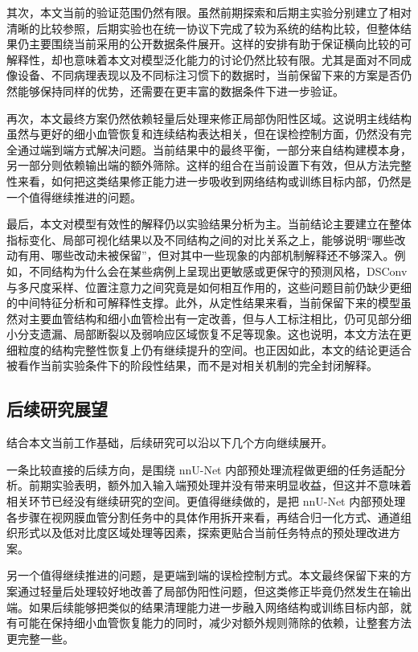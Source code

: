 \documentclass[a4paper,12pt]{article}
\begin{document}
其次，本文当前的验证范围仍然有限。虽然前期探索和后期主实验分别建立了相对清晰的比较参照，后期实验也在统一协议下完成了较为系统的结构比较，但整体结果仍主要围绕当前采用的公开数据条件展开。这样的安排有助于保证横向比较的可解释性，却也意味着本文对模型泛化能力的讨论仍然比较有限。尤其是面对不同成像设备、不同病理表现以及不同标注习惯下的数据时，当前保留下来的方案是否仍然能够保持同样的优势，还需要在更丰富的数据条件下进一步验证。

再次，本文最终方案仍然依赖轻量后处理来修正局部伪阳性区域。这说明主线结构虽然与更好的细小血管恢复和连续结构表达相关，但在误检控制方面，仍然没有完全通过端到端方式解决问题。当前结果中的最终平衡，一部分来自结构建模本身，另一部分则依赖输出端的额外筛除。这样的组合在当前设置下有效，但从方法完整性来看，如何把这类结果修正能力进一步吸收到网络结构或训练目标内部，仍然是一个值得继续推进的问题。

最后，本文对模型有效性的解释仍以实验结果分析为主。当前结论主要建立在整体指标变化、局部可视化结果以及不同结构之间的对比关系之上，能够说明“哪些改动有用、哪些改动未被保留”，但对其中一些现象的内部机制解释还不够深入。例如，不同结构为什么会在某些病例上呈现出更敏感或更保守的预测风格，DSConv 与多尺度采样、位置注意力之间究竟是如何相互作用的，这些问题目前仍缺少更细的中间特征分析和可解释性支撑。此外，从定性结果来看，当前保留下来的模型虽然对主要血管结构和细小血管检出有一定改善，但与人工标注相比，仍可见部分细小分支遗漏、局部断裂以及弱响应区域恢复不足等现象。这也说明，本文方法在更细粒度的结构完整性恢复上仍有继续提升的空间。也正因如此，本文的结论更适合被看作当前实验条件下的阶段性结果，而不是对相关机制的完全封闭解释。

\subsection{后续研究展望}
结合本文当前工作基础，后续研究可以沿以下几个方向继续展开。

一条比较直接的后续方向，是围绕 nnU-Net 内部预处理流程做更细的任务适配分析。前期实验表明，额外加入输入端预处理并没有带来明显收益，但这并不意味着相关环节已经没有继续研究的空间。更值得继续做的，是把 nnU-Net 内部预处理各步骤在视网膜血管分割任务中的具体作用拆开来看，再结合归一化方式、通道组织形式以及低对比度区域处理等因素，探索更贴合当前任务特点的预处理改进方案。

另一个值得继续推进的问题，是更端到端的误检控制方式。本文最终保留下来的方案通过轻量后处理较好地改善了局部伪阳性问题，但这类修正毕竟仍然发生在输出端。如果后续能够把类似的结果清理能力进一步融入网络结构或训练目标内部，就有可能在保持细小血管恢复能力的同时，减少对额外规则筛除的依赖，让整套方法更完整一些。
\end{document}
